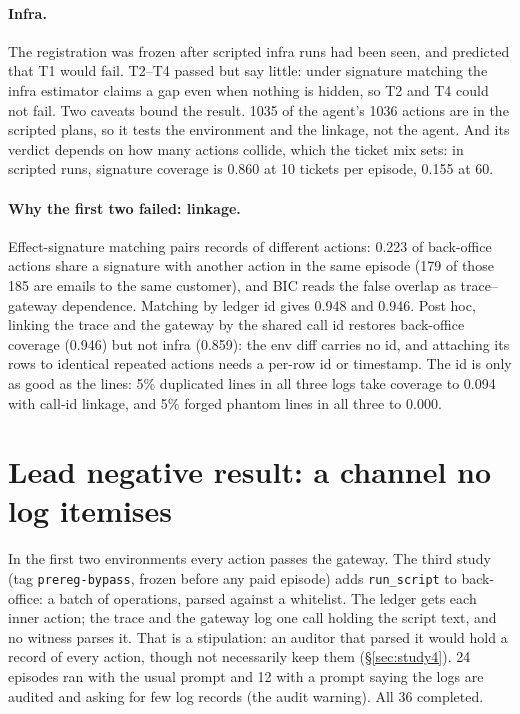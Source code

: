 \documentclass[11pt]{article}
\begin{document}
\paragraph{Infra.} The registration was frozen after scripted infra runs had been seen,
and predicted that T1 would fail. T2--T4 passed but say little: under signature matching
the infra estimator claims a gap even when nothing is hidden, so T2 and T4 could not fail.
Two caveats bound the result. 1035 of the agent's 1036 actions are in the scripted plans,
so it tests the environment and the linkage, not the agent. And its verdict depends on how
many actions collide, which the ticket mix sets: in scripted runs, signature coverage is
0.860 at 10 tickets per episode, 0.155 at 60.

\paragraph{Why the first two failed: linkage.} Effect-signature matching pairs records of
different actions: 0.223 of back-office actions share a signature with another action in
the same episode (179 of those 185 are emails to the same customer), and BIC reads the
false overlap as trace--gateway dependence. Matching by ledger id gives 0.948 and 0.946.
Post hoc, linking the trace and the gateway by the shared call id restores back-office
coverage (0.946) but not infra (0.859): the env diff carries no id, and attaching its rows
to identical repeated actions needs a per-row id or timestamp. The id is only as good as
the lines: 5\% duplicated lines in all three logs take coverage to 0.094 with call-id
linkage, and 5\% forged phantom lines in all three to 0.000.

\section{Lead negative result: a channel no log itemises}
\label{sec:bypass}

In the first two environments every action passes the gateway. The third study (tag
\texttt{prereg-bypass}, frozen before any paid episode) adds \texttt{run\_script} to
back-office: a batch of operations, parsed against a whitelist. The ledger gets each inner
action; the trace and the gateway log one call holding the script text, and no witness
parses it. That is a stipulation: an auditor that parsed it would hold a record of every action,
though not necessarily keep them (\S\ref{sec:study4}). 24
episodes ran with the usual prompt and 12 with a prompt saying the logs are audited and
asking for few log records (the audit warning). All 36 completed.
\end{document}
